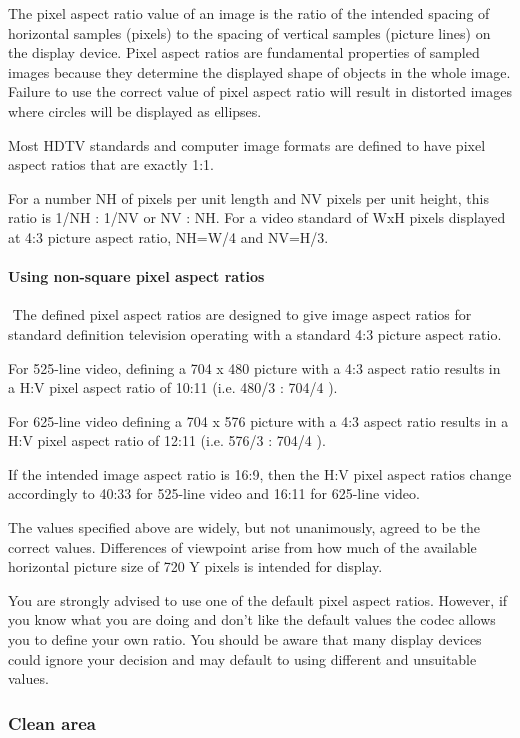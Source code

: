 \begin{informative*}
The pixel aspect ratio value of an image is the ratio of the intended spacing of
 horizontal samples (pixels) to the spacing of vertical samples (picture lines)
 on the display device. Pixel aspect ratios are fundamental properties of
sampled images because they determine the displayed shape of objects in the
 whole image. Failure to use the correct value of pixel aspect ratio will result
 in distorted images where circles will be displayed as ellipses.

Most HDTV standards and computer image formats are defined to have pixel aspect
 ratios that are exactly 1:1.

For a number NH of pixels per unit length and NV pixels per unit height, this
 ratio is 1/NH : 1/NV or NV : NH. For a video standard of WxH pixels displayed 
at 4:3 picture aspect ratio, NH=W/4 and NV=H/3.

\paragraph{Using non-square pixel aspect ratios}
\newline$ $
The defined pixel aspect ratios are designed to give image aspect ratios for
 standard definition television operating with a standard 4:3 picture aspect
 ratio.

For 525-line video, defining a 704 x 480 picture with a 4:3 aspect ratio results
 in a H:V pixel aspect ratio of 10:11 (i.e. 480/3 : 704/4 ).

For 625-line video defining a 704 x 576 picture with a 4:3 aspect ratio results
 in a H:V pixel aspect ratio of 12:11 (i.e. 576/3 : 704/4 ).

If the intended image aspect ratio is 16:9, then the H:V pixel aspect ratios
 change accordingly to 40:33 for 525-line video and 16:11 for 625-line video.

The values specified above are widely, but not unanimously, agreed to be the
 correct values. Differences of viewpoint arise from how much of the available
 horizontal picture size of 720 Y pixels is intended for display.

You are strongly advised to use one of the default pixel aspect ratios. However,
 if you know what you are doing and don’t like the default values the codec
 allows you to define your own ratio. You should be aware that many display
devices could ignore your decision and may default to using different and
 unsuitable values.

\subsubsection{Clean area}


\end{informative*}
